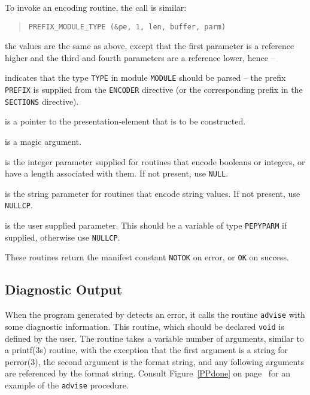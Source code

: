 To invoke an encoding routine, the call is similar:
\begin{quote}\small\begin{verbatim}
PREFIX_MODULE_TYPE (&pe, 1, len, buffer, parm)
\end{verbatim}\end{quote}
the values are the same as above, except that the first parameter
is a reference higher and the third and fourth parameters are a reference
lower,
hence --
\begin{describe}
\item[\verb"PREFIX\_MODULE\_TYPE":] indicates that the type
\verb"TYPE" in module
\verb"MODULE" should be parsed -- the prefix \verb"PREFIX" is supplied from
the \verb"ENCODER" directive
(or the corresponding prefix in the \verb"SECTIONS" directive).

\item[\verb"pe":] is a pointer to the presentation-element that is to be
constructed.

\item[\verb"1":] is a magic argument.

\item[\verb"len":] is the integer parameter supplied for routines that
encode booleans or integers, or have a length associated with them.
If not present, use \verb"NULL".

\item[\verb"buffer":] is the string parameter for routines that encode
string values.
If not present, use \verb"NULLCP".

\item[\verb"parm":] is the user supplied parameter. This should be a variable
of type \verb"PEPYPARM" if supplied,
otherwise use \verb"NULLCP".
\end{describe}

These routines return the manifest constant \verb"NOTOK" on error,
or \verb"OK" on success.

\subsection	{Diagnostic Output}\label{pepy:advise}
When the program generated by  detects an error,
it calls the routine \verb"advise" with some diagnostic information.
This routine, which should be declared \verb"void" is defined by the user.
The routine takes a variable number of arguments,
similar to a \man printf(3s) routine,
with the exception that the first argument is a string for \man perror(3),
the second argument is the format string,
and any following arguments are referenced by the format string.
Consult Figure~\ref{PPdone} on page~\pageref{PPdone} for an example of the
\verb"advise" procedure.

